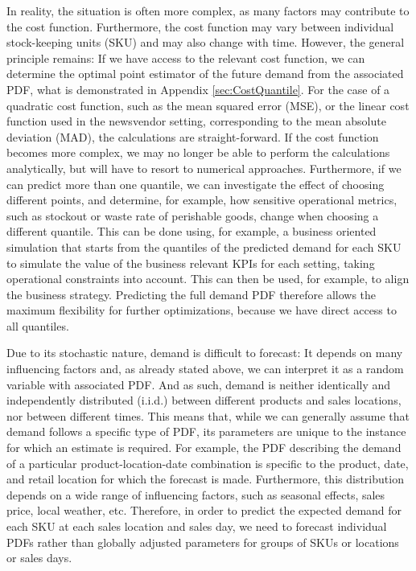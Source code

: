 \documentclass[BCOR=1mm, DIV=calc,10pt,
twoside=true,
twocolumn,
headings=normal]{scrartcl}
\begin{document}
In reality, the situation is often more complex, as many factors may contribute to the cost function. Furthermore, the cost function may vary between individual stock-keeping units (SKU) and may also change with time. However, the general principle remains: If we have access to the relevant cost function, we can determine the optimal point estimator of the future demand from the associated PDF, what is demonstrated in Appendix \ref{sec:CostQuantile}. For the case of a quadratic cost function, such as the mean squared error (MSE), or the linear cost function used in the newsvendor setting, corresponding to the mean absolute deviation (MAD), the calculations are straight-forward. If the cost function becomes more complex, we may no longer be able to perform the calculations analytically, but will have to resort to numerical approaches. Furthermore, if we can predict more than one quantile, we can investigate the effect of choosing different points, and determine, for example, how sensitive operational metrics, such as stockout or waste rate of perishable goods, change when choosing a different quantile. This can be done using, for example, a business oriented simulation that starts from the quantiles of the predicted demand for each SKU to simulate the value of the business relevant KPIs for each setting, taking operational constraints into account. This can then be used, for example, to align the business strategy. Predicting the full demand PDF therefore allows the maximum flexibility for further optimizations, because we have direct access to all quantiles.

Due to its stochastic nature, demand is difficult to forecast: It depends on many influencing factors and, as already stated above, we can interpret it as a random variable with associated PDF. And as such, demand is neither identically and independently distributed (i.i.d.) between different products and sales locations, nor between different times. This means that, while we can generally assume that demand follows a specific type of PDF, its parameters are unique to the instance for which an estimate is required. For example, the PDF describing the demand of a particular product-location-date combination is specific to the product, date, and retail location for which the forecast is made. Furthermore, this distribution depends on a wide range of influencing factors, such as seasonal effects, sales price, local weather, etc. Therefore, in order to predict the expected demand for each SKU at each sales location and sales day, we need to forecast individual PDFs rather than globally adjusted parameters for groups of SKUs or locations or sales days.
\end{document}
